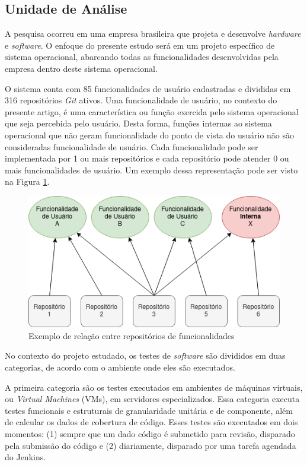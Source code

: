 \documentclass[11.5pt]{article}
\begin{document}
\subsection{Unidade de Análise} \label{Unidade de Análise}

A pesquisa ocorreu em uma empresa brasileira que projeta e desenvolve \textit{hardware} e
\textit{software}.
O enfoque do presente estudo será em um projeto específico de sistema operacional, abarcando todas
as funcionalidades desenvolvidas pela empresa dentro deste sistema operacional.

O sistema conta com 85 funcionalidades de usuário cadastradas e divididas em 316 repositórios
\textit{Git} ativos.
Uma funcionalidade de usuário, no contexto do presente artigo, é uma característica ou função
exercida pelo sistema operacional que seja percebida pelo usuário.
Desta forma, funções internas ao sistema operacional que não geram funcionalidade do ponto de vista
do usuário não são consideradas funcionalidade de usuário.
Cada funcionalidade pode ser implementada por 1 ou mais repositórios e cada repositório pode atender
0 ou mais funcionalidades de usuário. Um exemplo dessa representação pode ser visto na Figura
\ref{fig:features_repos}.

\begin{figure}[ht]
    \centering
    \includegraphics[width=.7\textwidth]{features_repos.png}
    \caption{Exemplo de relação entre repositórios de funcionalidades}
    \label{fig:features_repos}
\end{figure}

No contexto do projeto estudado, os testes de \textit{software} são divididos em duas categorias, de
acordo com o ambiente onde eles são executados.

A primeira categoria são os testes executados em ambientes de máquinas virtuais, ou
\textit{Virtual Machines} (VMs), em servidores especializados.
Essa categoria executa testes funcionais e estruturais de granularidade unitária e de componente,
além de calcular os dados de cobertura de código.
Esses testes são executados em dois momentos:
(1) sempre que um dado código é submetido para revisão, disparado pela submissão do código e
(2) diariamente, disparado por uma tarefa agendada do Jenkins.
\end{document}
